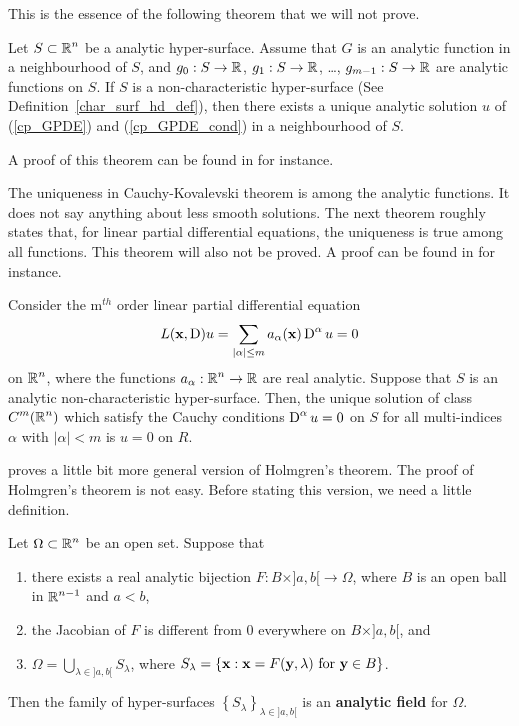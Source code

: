 This is the essence of the following theorem that we will not prove.

\begin{theorem} \label{cauchyKovalTh}
Let $\displaystyle S \subset \mathbb{R}^n$ be a analytic hyper-surface.  Assume that
$G$ is an analytic function in a neighbourhood of $S$, and
$g_0:S\rightarrow \mathbb{R}$, $g_1:S\rightarrow \mathbb{R}$, \ldots, 
$g_{m-1}:S\rightarrow \mathbb{R}$ are analytic functions on $S$.
If $S$ is a non-characteristic hyper-surface
(See Definition~\ref{char_surf_hd_def}),
then there exists a unique analytic solution $u$ of (\ref{cp_GPDE}) and
(\ref{cp_GPDE_cond}) in a neighbourhood of $S$.
\end{theorem}

A proof of this theorem can be found in \cite{J,Tr} for instance.

The uniqueness in Cauchy-Kovalevski theorem is among the analytic
functions.  It does not say anything about less smooth solutions.
The next theorem roughly states that, for linear partial differential
equations, the uniqueness is true among all functions.  This theorem
will also not be proved.  A proof can be found in \cite{Smo} for
instance.

\begin{theorem}[Holmgren] \label{HolmgrenTheo}
Consider the m$^{th}$ order linear partial differential equation
\[
L(\mathbf{x}, \operatorname{D})u = \sum_{|\alpha|\leq m} a_\alpha(\mathbf{x}) \operatorname{D}^\alpha u = 0
\]
on $\displaystyle \mathbb{R}^n$, where the functions
$\displaystyle a_\alpha:\mathbb{R}^n \rightarrow \mathbb{R}$
are real analytic. Suppose that $S$ is an analytic non-characteristic
hyper-surface.  Then, the unique solution of class $\displaystyle C^m(\mathbb{R}^n)$
which satisfy the Cauchy conditions $\displaystyle \operatorname{D}^\alpha u = 0$
on $S$ for all multi-indices $\alpha$ with $|\alpha|<m$ is $u=0$ on $R$.
\end{theorem}

\cite{J} proves a little bit more general version of Holmgren's theorem.
The proof of Holmgren's theorem is not easy.
Before stating this version, we need a little definition.

\begin{defn}
Let $\displaystyle \Omega \subset \mathbb{R}^n$ be an open set.  Suppose that
\begin{enumerate}
\item there exists a real analytic bijection
$F:B \times ]a,b[ \rightarrow \Omega$, where $B$ is an open ball in
$\displaystyle \mathbb{R}^{n-1}$ and $a<b$,
\item the Jacobian of $F$ is different from $0$ everywhere on
$B\times ]a,b[$, and
\item $\displaystyle \Omega = \bigcup_{\lambda \in ]a,b[} S_\lambda$, 
where $\displaystyle S_\lambda = \left\{ \mathbf{x} : \mathbf{x} = F(\mathbf{y},\lambda)
\ \text{for} \ \mathbf{y} \in B \right\}$.
\end{enumerate}
Then the family of hyper-surfaces
$\displaystyle \left\{ S_\lambda \right\}_{\lambda \in ]a,b[}$ is an
{\bfseries analytic field} for $\Omega$.
\end{defn}

